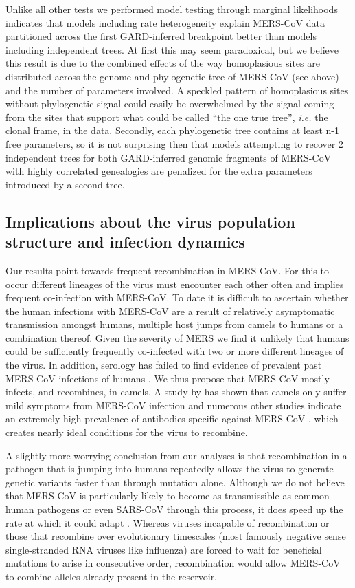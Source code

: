 \documentclass[11pt,oneside,letterpaper]{article}
\begin{document}
Unlike all other tests we performed model testing through marginal likelihoods indicates that models including rate heterogeneity explain MERS-CoV data partitioned across the first GARD-inferred breakpoint better than models including independent trees.
At first this may seem paradoxical, but we believe this result is due to the combined effects of the way homoplasious sites are distributed across the genome and phylogenetic tree of MERS-CoV (see above) and the number of parameters involved.
A speckled pattern of homoplasious sites without phylogenetic signal could easily be overwhelmed by the signal coming from the sites that support what could be called ``the one true tree'', \textit{i.e.} the clonal frame, in the data.
Secondly, each phylogenetic tree contains at least n-1 free parameters, so it is not surprising then that models attempting to recover 2 independent trees for both GARD-inferred genomic fragments of MERS-CoV with highly correlated genealogies are penalized for the extra parameters introduced by a second tree.

\subsection*{Implications about the virus population structure and infection dynamics}
Our results point towards frequent recombination in MERS-CoV.
For this to occur different lineages of the virus must encounter each other often and implies frequent co-infection with MERS-CoV.
To date it is difficult to ascertain whether the human infections with MERS-CoV are a result of relatively asymptomatic transmission amongst humans, multiple host jumps from camels to humans or a combination thereof.
Given the severity of MERS we find it unlikely that humans could be sufficiently frequently co-infected with two or more different lineages of the virus.
In addition, serology has failed to find evidence of prevalent past MERS-CoV infections of humans \citep{gierer_2013,aburizaiza_2013}.
We thus propose that MERS-CoV mostly infects, and recombines, in camels.
A study by  \cite{adney_2014} has shown that camels only suffer mild symptoms from MERS-CoV infection and numerous other studies indicate an extremely high prevalence of antibodies specific against MERS-CoV \citep{muller_2014,corman_antibodies_2014,chu_2014,reusken_2013,reusken_2014}, which creates nearly ideal conditions for the virus to recombine.

A slightly more worrying conclusion from our analyses is that recombination in a pathogen that is jumping into humans repeatedly allows the virus to generate genetic variants faster than through mutation alone.
Although we do not believe that MERS-CoV is particularly likely to become as transmissible as common human pathogens or even SARS-CoV through this process, it does speed up the rate at which it could adapt \citep{muller_1932}.
Whereas viruses incapable of recombination or those that recombine over evolutionary timescales (most famously negative sense single-stranded RNA viruses like influenza) are forced to wait for beneficial mutations to arise in consecutive order, recombination would allow MERS-CoV to combine alleles already present in the reservoir.
\end{document}
